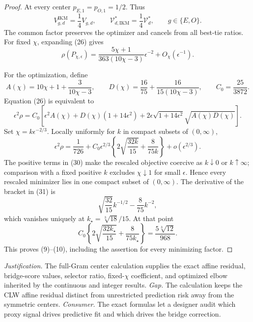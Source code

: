 \documentclass{article}
\begin{document}
\begin{proof}
At every center \(p_{E,1}=p_{O,1}=1/2\).  Thus
\[
 V_{g,d}^{\mathrm{IKM}}=\frac14V_{g,d},
 \qquad
 \mathcal V_{d,\mathrm{IKM}}^*=\frac14\mathcal V_d^*,
 \qquad g\in\{E,O\}.                                     \tag{28}
\]
The common factor preserves the optimizer and cancels from all best-tie ratios.  For fixed \(\chi\), expanding (26) gives
\[
 \rho(P_{\chi,\epsilon})
 =\frac{5\chi+1}{363(10\chi-3)}\epsilon^{-2}
 +O_\chi(\epsilon^{-1}).                                  \tag{29}
\]

For the optimization, define
\[
 A(\chi)=10\chi+1+\frac3{10\chi-3},
 \qquad
 D(\chi)=\frac{16}{75}+\frac{16}{15(10\chi-3)},
 \qquad C_0=\frac{25}{3872}.
\]
Equation (26) is equivalent to
\[
 \epsilon^2\rho=C_0\left[
 \epsilon^2A(\chi)+D(\chi)(1+14\epsilon^2)
 +2\epsilon\sqrt{1+14\epsilon^2}\sqrt{A(\chi)D(\chi)}
 \right].                                                  \tag{30}
\]
Set \(\chi=k\epsilon^{-2/3}\).  Locally uniformly for \(k\) in compact subsets of \((0,\infty)\),
\[
 \epsilon^2\rho
 =\frac1{726}+C_0\epsilon^{2/3}
 \left\{2\sqrt{\frac{32k}{15}}+\frac8{75k}\right\}
 +o(\epsilon^{2/3}).                                      \tag{31}
\]
The positive terms in (30) make the rescaled objective coercive as \(k\downarrow0\) or \(k\uparrow\infty\); comparison with a fixed positive \(k\) excludes \(\chi\downarrow1\) for small \(\epsilon\).  Hence every rescaled minimizer lies in one compact subset of \((0,\infty)\).  The derivative of the bracket in (31) is
\[
 \sqrt{\frac{32}{15}}k^{-1/2}-\frac8{75}k^{-2},
\]
which vanishes uniquely at \(k_\star=\sqrt[3]{18}/15\).  At that point
\[
 C_0\left\{2\sqrt{\frac{32k_\star}{15}}+\frac8{75k_\star}\right\}
 =\frac{5\sqrt[3]{12}}{968}.
\]
This proves (9)--(10), including the assertion for every minimizing factor.
\end{proof}
\par\smallskip\noindent \textit{Justification.} The full-Gram center calculation supplies the exact affine residual, bridge-score values, selector ratio, fixed-\(\chi\) coefficient, and optimized elbow inherited by the continuous and integer results. \textit{Gap.} The calculation keeps the CLW affine residual distinct from unrestricted prediction risk away from the symmetric centers. \textit{Consumer.} The exact formulas let a designer audit which proxy signal drives predictive fit and which drives the bridge correction.
\end{document}
